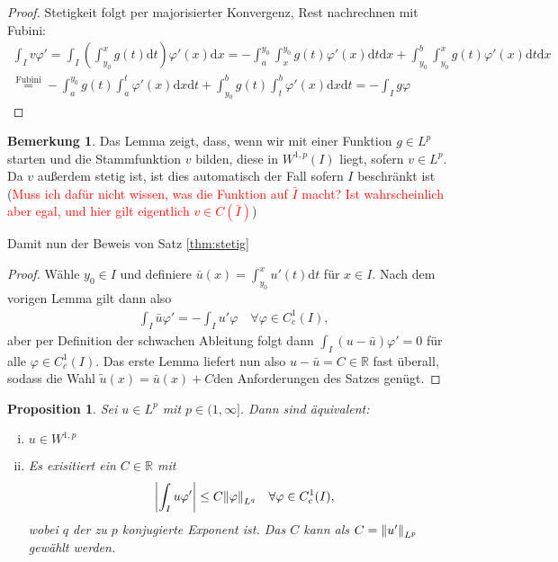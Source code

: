 \documentclass[twoside]{article}
\newtheorem{proposition}[theorem]{Proposition}
\theoremstyle{definition}
\newtheorem{remark}[theorem]{Bemerkung}
\begin{document}
\begin{proof}
Stetigkeit folgt per majorisierter Konvergenz, Rest nachrechnen mit Fubini: 
\begin{align*}
\int_I v \varphi' = \int_I  \left(\int_{y_0}^x g(t) \mathrm{d}t \right) \varphi'(x) \mathrm{d}x = - \int_{a}^{y_0} \int_x^{y_0} g(t) \varphi'(x) \mathrm{d} t \mathrm{d}x + \int_{y_0}^b \int_{y_0}^x g(t) \varphi'(x) \mathrm{d} t \mathrm{d}x\\
\overset{\text{Fubini}}{=} - \int_{a}^{y_0} g(t) \int_a^{t}  \varphi'(x) \mathrm{d} x \mathrm{d}t + \int_{y_0}^b g(t) \int_{t}^b \varphi'(x) \mathrm{d} x \mathrm{d}t = - \int_I g \varphi
\end{align*}
\end{proof}
\begin{remark} \label{bem:stammfkt}
Das Lemma zeigt, dass, wenn wir mit einer Funktion $g \in L^p$ starten und die Stammfunktion $v$ bilden, diese in $W^{1,p}(I)$ liegt, sofern $v \in L^p$. Da $v$ außerdem stetig ist, ist dies automatisch der Fall sofern $I$ beschränkt ist (\textcolor{red}{Muss ich dafür nicht wissen, was die Funktion auf $\bar{I}$ macht? Ist wahrscheinlich aber egal, und hier gilt eigentlich $v \in C(\bar{I})$})
\end{remark}
Damit nun der Beweis von Satz \ref{thm:stetig}  
\begin{proof}
Wähle $y_0 \in I$ und definiere $\bar{u}(x) = \int_{y_0}^x u'(t) \mathrm{d}t$ für $x \in I$. Nach dem vorigen Lemma gilt dann also 
\begin{align*}
\int_I \bar{u} \varphi' = - \int_I u' \varphi \quad \forall \varphi \in C_c^1(I),
\end{align*}
aber per Definition der schwachen Ableitung folgt dann $\int_I (u - \bar{u}) \varphi' = 0$ für alle $\varphi \in C_c^1(I)$. Das erste Lemma liefert nun also $u - \bar{u} = C \in \mathbb{R}$ fast überall, sodass die Wahl $\tilde{u}(x) = \bar{u}(x) + C$den Anforderungen des Satzes genügt.
\end{proof}
\begin{proposition} \label{prop:ungl}
Sei $u \in L^p$ mit $p \in (1,\infty]$. Dann sind äquivalent:
\begin{enumerate}[(i)]
\item $u \in W^{1,p}$
\item Es exisitiert ein $C \in \mathbb{R}$ mit
\begin{align*}
\abs{\int_I u \varphi'} \leq C \norm{\varphi}_{L^q} \quad \forall \varphi \in C_c^1(I),
\end{align*}
wobei $q$ der zu $p$ konjugierte Exponent ist. Das $C$ kann als $C = \norm{u'}_{L^p}$ gewählt werden.
\end{enumerate}
\end{proposition}
\end{document}
